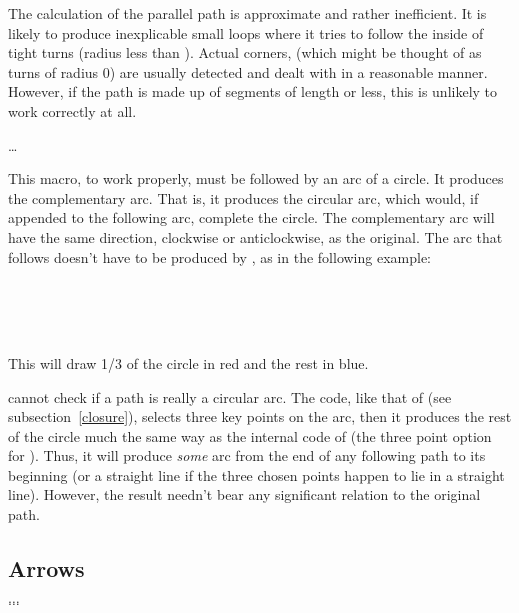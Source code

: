 \documentclass[letterpaper]{article}
\begin{document}
The calculation of the parallel path is approximate and rather
inefficient. It is likely to produce inexplicable small loops where it
tries to follow the inside of tight turns (radius less than
). Actual corners, (which might be thought of as turns of
radius $0$) are usually detected and dealt with in a reasonable manner.
However, if the path is made up of segments of length  or
less, this is unlikely to work correctly at all.

\begin{cd}
\dots%
\end{cd}

This macro, to work properly, must be followed by an arc of a circle. It
produces the complementary arc. That is, it produces the circular arc,
which would, if appended to the following arc, complete the circle. The
complementary arc will have the same direction, clockwise or
anticlockwise, as the original. The arc that follows doesn't have to be
produced by , as in the following example:
\begin{ex}
\\
\ \\
\ 
\end{ex}
This will draw 1/3 of the circle in red and the rest in blue.

\CMF{} cannot check if a path is really a circular arc. The \MF{} code,
like that of  (see subsection~\ref{closure}), selects
three key points on the arc, then it produces the rest of the circle
much the same way as the internal code of  (the three
point option for ). Thus, it will produce \emph{some} arc from
the end of any following path to its beginning (or a straight line if
the three chosen points happen to lie in a straight line). However, the
result needn't bear any significant relation to the original path.


\subsection{Arrows}\label{arrows}

\begin{cd}
%
    $\ldots$\\
%
    $\ldots$%
\end{cd}
\end{document}
